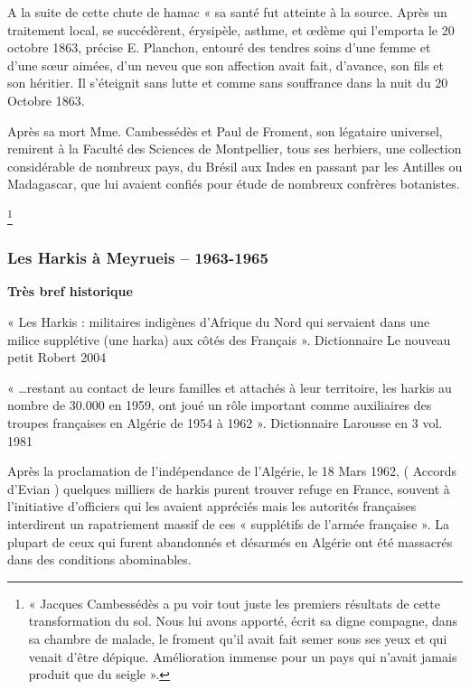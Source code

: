 A la suite de cette chute de hamac « sa santé fut atteinte à la source. Après un traitement
local, se succédèrent, érysipèle, asthme, et œdème qui l’emporta le 20 octobre 1863, précise
E. Planchon, entouré des tendres soins d’une femme et d’une sœur aimées, d’un neveu que
son affection avait fait, d’avance, son fils et son héritier. Il s’éteignit sans lutte et comme sans
souffrance dans la nuit du 20 Octobre 1863.

Après sa mort Mme. Cambessédès et Paul de Froment, son légataire universel, remirent à la
Faculté des Sciences de Montpellier, tous ses herbiers, une collection considérable de
nombreux pays, du Brésil aux Indes en passant par les Antilles ou Madagascar, que lui
avaient confiés pour étude de nombreux confrères botanistes.

\footnote{« Jacques Cambessédès a pu voir tout juste les premiers résultats de cette transformation du sol. Nous lui
avons apporté, écrit sa digne compagne, dans sa chambre de malade, le froment qu’il avait fait semer sous ses
yeux et qui venait d’être dépique. Amélioration immense pour un pays qui n’avait jamais produit que du seigle ».}

\subsubsection{Les Harkis à Meyrueis -- 1963-1965}

\vspace{5mm}

\textbf{Très bref historique}

« Les Harkis : militaires indigènes d’Afrique du Nord qui servaient dans une milice
supplétive (une harka) aux côtés des Français ». Dictionnaire Le nouveau petit Robert 2004

« …restant au contact de leurs familles et attachés à leur territoire, les harkis au
nombre de 30.000 en 1959, ont joué un rôle important comme auxiliaires des troupes
françaises en Algérie de 1954 à 1962 ». Dictionnaire Larousse en 3 vol. 1981

Après la proclamation de l’indépendance de l’Algérie, le 18 Mars 1962, ( Accords
d’Evian ) quelques milliers de harkis purent trouver refuge en France, souvent à
l’initiative d’officiers qui les avaient appréciés mais les autorités françaises interdirent
un rapatriement massif de ces « supplétifs de l’armée française ». La plupart de ceux
qui furent abandonnés et désarmés en Algérie ont été massacrés dans des conditions
abominables.

